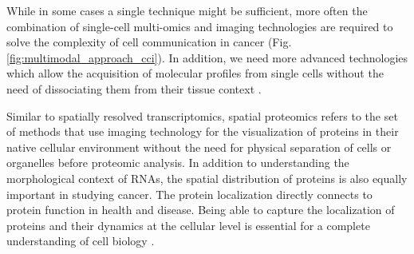 While in some cases a single technique might be sufficient, more often the combination of single-cell multi-omics and imaging technologies are required to solve the complexity of cell communication in cancer (Fig.\ref{fig:multimodal_approach_cci}). In addition, we need more advanced technologies which allow the acquisition of molecular profiles from single cells without the need of dissociating them from their tissue context \cite{de2020unraveling}. 

Similar to spatially resolved transcriptomics, spatial proteomics refers to the set of methods that use imaging technology for the visualization of proteins in their native cellular environment without the need for physical separation of cells or organelles before proteomic analysis. In addition to understanding the morphological context of RNAs, the spatial distribution of proteins is also equally important in studying cancer. The protein localization directly connects to protein function in health and disease. Being able to capture the localization of proteins and their dynamics at the cellular level is essential for a complete understanding of cell biology \cite{lundberg2019spatial}. 

